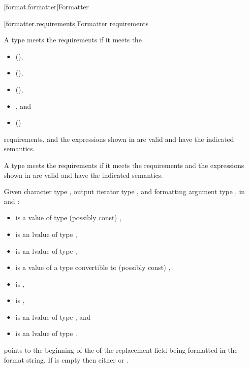 [format.formatter]{Formatter}

[formatter.requirements]{Formatter requirements}

\pnum
A type  meets the  requirements if
it meets the
\begin{itemize}
\item {} (),
\item {} (),
\item {} (),
\item {}, and
\item {} ()
\end{itemize}
requirements, and
the expressions shown in  are valid and
have the indicated semantics.

\pnum
A type  meets the  requirements
if it meets the  requirements and
the expressions shown in  are valid and
have the indicated semantics.

\pnum
Given character type , output iterator type
, and formatting argument type ,
in  and :
\begin{itemize}
\item {} is a value of type (possibly const) ,
\item {} is an lvalue of type ,
\item {} is an lvalue of type ,
\item {} is a value of a type convertible to (possibly const) ,
\item {} is ,
\item {} is ,
\item {} is an lvalue of type , and
\item {} is an lvalue of type .
\end{itemize}
 points to the beginning of the
of the replacement field being formatted
in the format string.
If  is empty then either
 or
.

